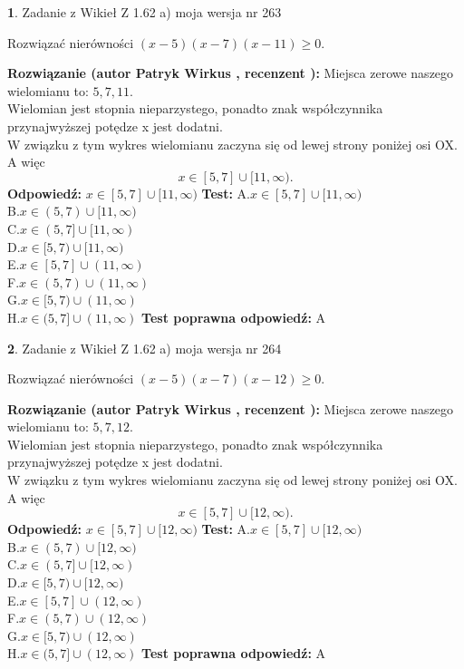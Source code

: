 \documentclass[12pt, a4paper]{article}
\theoremstyle{definition} %
\newtheorem{zad}{}
\newcommand{\zadStart}[1]{\begin{zad}#1\newline}
\newcommand{\zadStop}{\end{zad}}
\newcommand{\rozwStart}[2]{\noindent \textbf{Rozwiązanie (autor #1 , recenzent #2): }\newline}
\newcommand{\rozwStop}{\newline}
\newcommand{\odpStart}{\noindent \textbf{Odpowiedź:}\newline}
\newcommand{\odpStop}{\newline}
\newcommand{\testStart}{\noindent \textbf{Test:}\newline}
\newcommand{\testStop}{\newline}
\newcommand{\kluczStart}{\noindent \textbf{Test poprawna odpowiedź:}\newline}
\newcommand{\kluczStop}{\newline}
\begin{document}
\zadStart{Zadanie z Wikieł Z 1.62 a) moja wersja nr 263}

Rozwiązać nierówności $(x-5)(x-7)(x-11)\ge0$.
\zadStop
\rozwStart{Patryk Wirkus}{}
Miejsca zerowe naszego wielomianu to: $5, 7, 11$.\\
Wielomian jest stopnia nieparzystego, ponadto znak współczynnika przy\linebreak najwyższej potędze x jest dodatni.\\ W związku z tym wykres wielomianu zaczyna się od lewej strony poniżej osi OX. A więc $$x \in [5,7] \cup [11,\infty).$$
\rozwStop
\odpStart
$x \in [5,7] \cup [11,\infty)$
\odpStop
\testStart
A.$x \in [5,7] \cup [11,\infty)$\\
B.$x \in (5,7) \cup [11,\infty)$\\
C.$x \in (5,7] \cup [11,\infty)$\\
D.$x \in [5,7) \cup [11,\infty)$\\
E.$x \in [5,7] \cup (11,\infty)$\\
F.$x \in (5,7) \cup (11,\infty)$\\
G.$x \in [5,7) \cup (11,\infty)$\\
H.$x \in (5,7] \cup (11,\infty)$
\testStop
\kluczStart
A
\kluczStop



\zadStart{Zadanie z Wikieł Z 1.62 a) moja wersja nr 264}

Rozwiązać nierówności $(x-5)(x-7)(x-12)\ge0$.
\zadStop
\rozwStart{Patryk Wirkus}{}
Miejsca zerowe naszego wielomianu to: $5, 7, 12$.\\
Wielomian jest stopnia nieparzystego, ponadto znak współczynnika przy\linebreak najwyższej potędze x jest dodatni.\\ W związku z tym wykres wielomianu zaczyna się od lewej strony poniżej osi OX. A więc $$x \in [5,7] \cup [12,\infty).$$
\rozwStop
\odpStart
$x \in [5,7] \cup [12,\infty)$
\odpStop
\testStart
A.$x \in [5,7] \cup [12,\infty)$\\
B.$x \in (5,7) \cup [12,\infty)$\\
C.$x \in (5,7] \cup [12,\infty)$\\
D.$x \in [5,7) \cup [12,\infty)$\\
E.$x \in [5,7] \cup (12,\infty)$\\
F.$x \in (5,7) \cup (12,\infty)$\\
G.$x \in [5,7) \cup (12,\infty)$\\
H.$x \in (5,7] \cup (12,\infty)$
\testStop
\kluczStart
A
\kluczStop
\end{document}
